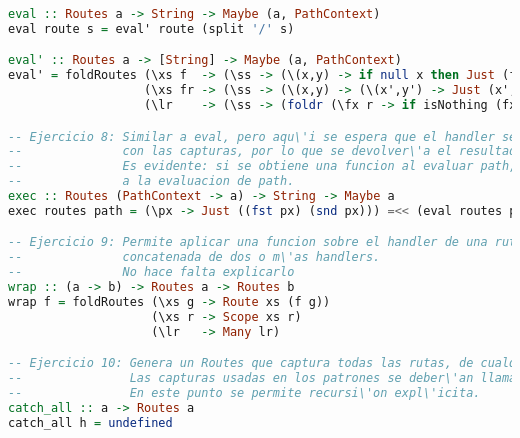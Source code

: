 \documentclass[10pt,a4paper]{article}
\begin{document}
\begin{lstlisting}[language=Haskell,breaklines=true,basicstyle=\tiny]
eval :: Routes a -> String -> Maybe (a, PathContext)
eval route s = eval' route (split '/' s)

eval' :: Routes a -> [String] -> Maybe (a, PathContext)
eval' = foldRoutes (\xs f  -> (\ss -> (\(x,y) -> if null x then Just (f,y) else Nothing) =<< (matches ss xs)))
                   (\xs fr -> (\ss -> (\(x,y) -> (\(x',y') -> Just (x', y++y')) =<< (fr x)) =<< (matches ss xs)))
                   (\lr    -> (\ss -> (foldr (\fx r -> if isNothing (fx ss) then r else (fx ss)) Nothing) lr))

-- Ejercicio 8: Similar a eval, pero aqu\'i se espera que el handler sea una funci\'on que recibe como entrada el contexto 
--              con las capturas, por lo que se devolver\'a el resultado de su aplicaci\'on, en caso de haber coincidencia.
--              Es evidente: si se obtiene una funcion al evaluar path, se aplica dicha funcion sobre el PathContext correspondiente 
--              a la evaluacion de path.
exec :: Routes (PathContext -> a) -> String -> Maybe a
exec routes path = (\px -> Just ((fst px) (snd px))) =<< (eval routes path)

-- Ejercicio 9: Permite aplicar una funcion sobre el handler de una ruta. Esto, por ejemplo, podr\'ia permitir la ejecuci\'on 
--              concatenada de dos o m\'as handlers.
--              No hace falta explicarlo
wrap :: (a -> b) -> Routes a -> Routes b
wrap f = foldRoutes (\xs g -> Route xs (f g))
                    (\xs r -> Scope xs r)
                    (\lr   -> Many lr)

-- Ejercicio 10: Genera un Routes que captura todas las rutas, de cualquier longitud. A todos los patrones devuelven el mismo valor. 
--               Las capturas usadas en los patrones se deber\'an llamar p0, p1, etc. 
--               En este punto se permite recursi\'on expl\'icita.
catch_all :: a -> Routes a
catch_all h = undefined

\end{lstlisting}
 \newpage
\end{document}
